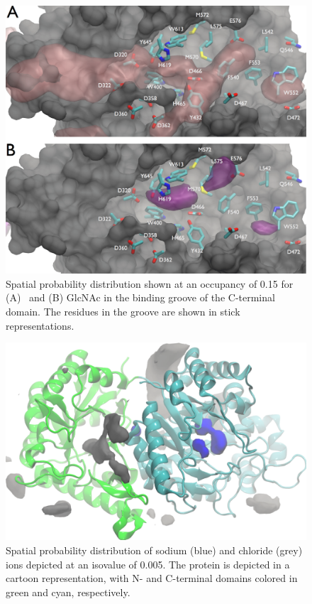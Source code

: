 \begin{figure}[htbp]
\centering
\includegraphics[width=6.25in]{figures/results4/cterm_groove_surf3.pdf}
\caption[Spatial probability densities of GlcNAc and GlcNH3+ in the C-terminal groove]{Spatial probability distribution shown at an occupancy of 0.15 for (A) \glucosamine\ and (B) GlcNAc in the binding groove of the C-terminal domain. The residues in the groove are shown in stick representations.}
\label{fig:groove}
\end{figure}

\begin{figure}[htbp]
\centering
\includegraphics[width=6.25in]{figures/results4/pgab_glucosamine_salt_densities.pdf}
\caption[Ionic distribution]{Spatial probability distribution of sodium (blue) and chloride (grey) ions depicted at an isovalue of 0.005. The protein is depicted in a cartoon representation, with N- and C-terminal domains colored in green and cyan, respectively.}
\label{fig:salt_density_distribution}
\end{figure}

